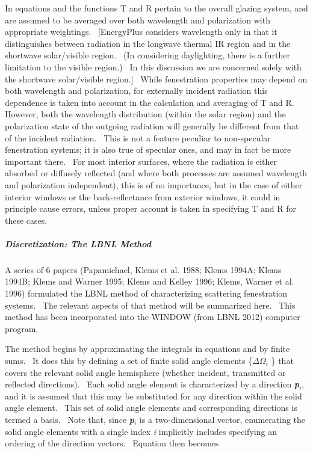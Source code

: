 In equations and the functions T and R pertain to the overall glazing system, and are assumed to be averaged over both wavelength and polarization with appropriate weightings.~ {[}EnergyPlus considers wavelength only in that it distinguishes between radiation in the longwave thermal IR region and in the shortwave solar/visible region.~ (In considering daylighting, there is a further limitation to the visible region.)~ In this discussion we are concerned solely with the shortwave solar/visible region.{]}~ While fenestration properties may depend on both wavelength and polarization, for externally incident radiation this dependence is taken into account in the calculation and averaging of T and R.~ However, both the wavelength distribution (within the solar region) and the polarization state of the outgoing radiation will generally be different from that of the incident radiation.~ This is not a feature peculiar to non-specular fenestration systems; it is also true of specular ones, and may in fact be more important there.~ For most interior surfaces, where the radiation is either absorbed or diffusely reflected (and where both processes are assumed wavelength and polarization independent), this is of no importance, but in the case of either interior windows or the back-reflectance from exterior windows, it could in principle cause errors, unless proper account is taken in specifying T and R for these cases.

\subparagraph{Discretization: The LBNL Method}\label{discretization-the-lbnl-method}

A series of 6 papers (Papamichael, Klems et al. 1988; Klems 1994A; Klems 1994B; Klems and Warner 1995; Klems and Kelley 1996; Klems, Warner et al. 1996) formulated the LBNL method of characterizing scattering fenestration systems.~ The relevant aspects of that method will be summarized here.~ This method has been incorporated into the WINDOW (from LBNL 2012) computer program.

The method begins by approximating the integrals in equations and by finite sums.~ It does this by defining a set of finite solid angle elements \{\(\Delta {\Omega_i}\) \} that covers the relevant solid angle hemisphere (whether incident, transmitted or reflected directions).~ Each solid angle element is characterized by a direction \textbf{\emph{p}}\emph{\(_{i}\)}, and it is assumed that this may be substituted for any direction within the solid angle element.~ This set of solid angle elements and corresponding directions is termed a basis.~ Note that, since \textbf{\emph{p}}\emph{\(_{i}\)} is a two-dimensional vector, enumerating the solid angle elements with a single index \emph{i} implicitly includes specifying an ordering of the direction vectors.~ Equation then becomes

